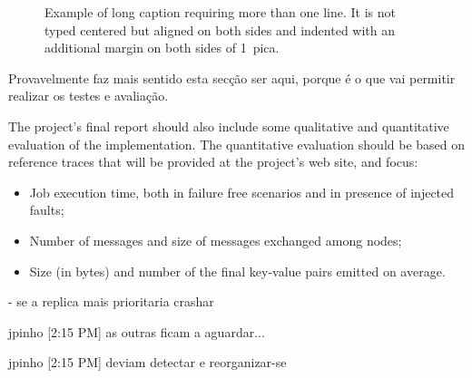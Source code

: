 \documentclass[times, 10pt,twocolumn]{article}
\begin{document}
	
	\begin{figure}[h] 
		\caption{Example of long caption requiring more than one line. It is 
			not typed centered but aligned on both sides and indented with an 
			additional margin on both sides of 1~pica.}
	\end{figure}
	
	Provavelmente faz mais sentido esta secção ser aqui, porque é o que vai permitir realizar os testes e avaliação.
	
	
	
	
	
	
	
	
	
	The project’s final report should also include some	qualitative and quantitative evaluation of the implementation. The quantitative evaluation should be based on reference traces that will be provided at the project’s web site, and focus:
	\begin{itemize}
		\item Job execution time, both in failure free scenarios and in presence of injected faults;
		\item Number of messages and size of messages exchanged among nodes;
		\item Size (in bytes) and number of the final key-value pairs emitted on average. 
	\end{itemize}	
	
	- se a replica mais prioritaria crashar
	
	jpinho [2:15 PM]
	as outras ficam a aguardar...
	
	jpinho [2:15 PM]
	deviam detectar e reorganizar-se
	
	
	\nocite{ex1,ex2}
	
	
	
\end{document}
